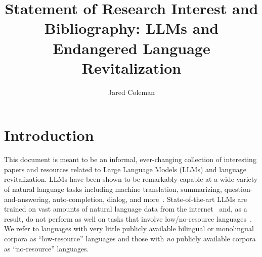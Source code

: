 \documentclass{article}
\title{Statement of Research Interest and Bibliography: LLMs and Endangered Language Revitalization}
\author{Jared Coleman}
\date{}
\begin{document}
\maketitle



\section*{Introduction}
This document is meant to be an informal, ever-changing collection of interesting papers and resources related to Large Language Models (LLMs) and language revitalization.
LLMs have been shown to be remarkably capable at a wide variety of natural language tasks including machine translation, summarizing, question-and-answering, auto-completion, dialog, and more~\cite{gpt:agi}.
State-of-the-art LLMs are trained on vast amounts of natural language data from the internet~\cite{gpt:gpt4-tech-report} and, as a result, do not perform as well on tasks that involve low/no-resource languages~\cite{palm,gpt:low-resource-translation}.
We refer to languages with very little publicly available bilingual or monolingual corpora as ``low-resource'' languages and those with \textit{no} publicly available corpora as ``no-resource'' languages.
\end{document}
